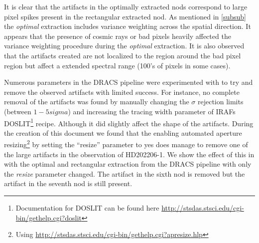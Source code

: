 It is clear that the artifacts in the optimally extracted nods correspond to large pixel spikes present in the rectangular extracted nod. As mentioned in \ref{subsub} the \emph{optimal} extraction includes variance weighting across the spatial direction. It appears that the presence of cosmic rays or bad pixels heavily affected the variance weighting procedure during the \emph{optimal} extraction. It is also observed that the artifacts created are not localized to the region around the bad pixel region but affect a extended spectral range (100's of pixels in some cases). 

Numerous parameters in the DRACS pipeline were experimented with to try and remove the observed artifacts with limited success. For instance, no complete removal of the artifacts was found by manually changing the \(\sigma\) rejection limits (between \(1-5 sigma\)) and increasing the tracing width parameter of IRAFs DOSLIT\footnote{Documentation for DOSLIT can be found here \href{http://stsdas.stsci.edu/cgi-bin/gethelp.cgi?doslit}{http://stsdas.stsci.edu/cgi-bin/gethelp.cgi?doslit}} recipe. Although it did slightly affect the shape of the artifacts. 
During the creation of this document we found that the enabling automated aperture resizing\footnote{Using \href{apresize}{http://stsdas.stsci.edu/cgi-bin/gethelp.cgi?apresize.hlp}} by setting the ``resize'' parameter to yes does manage to remove one of the large artifacts in the observation of {HD202206-1}. We show the effect of this in  with the optimal and rectangular extraction from the DRACS pipeline with only the \emph{resize} parameter changed. The artifact in the sixth nod is removed but the artifact in the seventh nod is still present.
